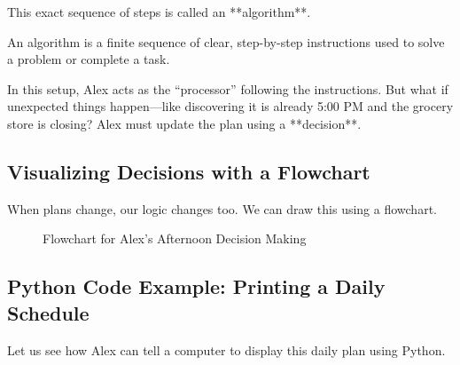 This exact sequence of steps is called an **algorithm**.

\begin{definition}[Algorithm]
An algorithm is a finite sequence of clear, step-by-step instructions used to solve a problem or complete a task.
\end{definition}

In this setup, Alex acts as the ``processor'' following the instructions. But what if unexpected things happen—like discovering it is already 5:00 PM and the grocery store is closing? Alex must update the plan using a **decision**.

\subsection{Visualizing Decisions with a Flowchart}

When plans change, our logic changes too. We can draw this using a flowchart.

\begin{figure}[h]
    \centering
    \caption{Flowchart for Alex's Afternoon Decision Making}
    \label{fig:afternoon_flowchart}
\end{figure}

\subsection{Python Code Example: Printing a Daily Schedule}

Let us see how Alex can tell a computer to display this daily plan using Python.

